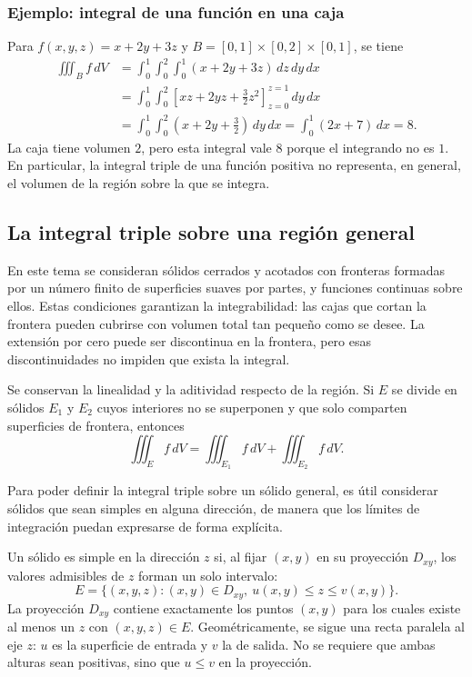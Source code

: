 \subsubsection*{Ejemplo: integral de una función en una caja}

Para $f(x,y,z)=x+2y+3z$ y $B=[0,1]\times[0,2]\times[0,1]$, se tiene
\begin{align*}
\iiint_B f\,dV
&=\int_0^1\int_0^2\int_0^1(x+2y+3z)\,dz\,dy\,dx\\
&=\int_0^1\int_0^2\left[xz+2yz+\frac32z^2\right]_{z=0}^{z=1}\,dy\,dx\\
&=\int_0^1\int_0^2\left(x+2y+\frac32\right)\,dy\,dx
=\int_0^1(2x+7)\,dx=8.
\end{align*}
La caja tiene volumen $2$, pero esta integral vale $8$ porque el integrando no es $1$. En particular, la integral triple de una función positiva no representa, en general, el volumen de la región sobre la que se integra.

\subsection{La integral triple sobre una región general}

En este tema se consideran sólidos cerrados y acotados con fronteras formadas por un número finito de superficies suaves por partes, y funciones continuas sobre ellos. Estas condiciones garantizan la integrabilidad: las cajas que cortan la frontera pueden cubrirse con volumen total tan pequeño como se desee. La extensión por cero puede ser discontinua en la frontera, pero esas discontinuidades no impiden que exista la integral.

Se conservan la linealidad y la aditividad respecto de la región. Si $E$ se divide en sólidos $E_1$ y $E_2$ cuyos interiores no se superponen y que solo comparten superficies de frontera, entonces
\[
\iiint_E f\,dV=\iiint_{E_1}f\,dV+\iiint_{E_2}f\,dV.
\]

Para poder definir la integral triple sobre un sólido general, es útil considerar sólidos que sean simples en alguna dirección, de manera que los límites de integración puedan expresarse de forma explícita.

Un sólido es simple en la dirección $z$ si, al fijar $(x,y)$ en su proyección $D_{xy}$, los valores admisibles de $z$ forman un solo intervalo:
\[
E=\{(x,y,z):(x,y)\in D_{xy},\ u(x,y)\leq z\leq v(x,y)\}.
\]
La proyección $D_{xy}$ contiene exactamente los puntos $(x,y)$ para los cuales existe al menos un $z$ con $(x,y,z)\in E$. Geométricamente, se sigue una recta paralela al eje $z$: $u$ es la superficie de entrada y $v$ la de salida. No se requiere que ambas alturas sean positivas, sino que $u\leq v$ en la proyección.


